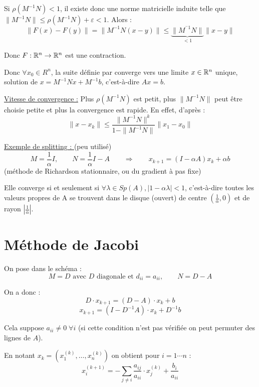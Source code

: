 Si $\rho (M^{-1}N) < 1$, il existe donc une norme matricielle induite telle que $\| M ^{-1} N \| \leq \rho (M^{-1} N) + \varepsilon < 1$. Alors :
\[
    \| F(x) - F(y) \| = \| M^{-1} N (x-y) \| \leq \underbrace{\| M^{^-1}N \|}_{< 1} \| x-y \|
\]

Donc $F : \mathbb{R}^n \rightarrow \mathbb{R}^n$ est une contraction.

Donc $\forall x_0 \in R^n$, la suite définie par  converge vers une limite $x \in \mathbb{R}^n$ unique, solution de $x = M^{-1}Nx+M^{-1}b$, c'est-à-dire $Ax=b$.

\vspace{1cm}
\underline{Vitesse de convergence :} Plus $\rho(M^{-1}N)$ est petit, plus $\|M^{-1}N\|$ peut être choisie petite et plus la convergence est rapide.
En effet, d'après  :
\[
    \|x-x_k\| \leq \frac{\|M^{-1}N\|^k}{1-\|M^{-1}N\|}\|x_1-x_0\|
\]

\vspace{1cm}
\underline{Exemple de splitting : } (peu utilisé)
\[
    M = \frac{1}{\alpha}I, \qquad N = \frac{1}{\alpha}I - A \qquad \Longrightarrow \qquad x_{k+1} = (I - \alpha A)x_k + \alpha b
\]
(méthode de Richardson stationnaire, ou du gradient à pas fixe)

Elle converge si et seulement si $\forall \lambda \in Sp(A), |1-\alpha \lambda | < 1$, c'est-à-dire toutes les valeurs propres de A se trouvent dans le disque (ouvert) de centre $(\frac{1}{\alpha}, 0)$ et de rayon $\left| \frac{1}{\alpha} \right|$.

\section{Méthode de Jacobi}
On pose dans le schéma  :
\[
    M = D \mbox{ avec $D$ diagonale et } d_{ii}=a_{ii}, \qquad N=D-A
\]

On a donc :
\begin{equation}
D \cdot x_{k+1} = (D-A) \cdot x_k + b
\end{equation}
\begin{equation}
x_{k+1} = (I - D^{-1}A) \cdot x_k + D^{-1} b
\end{equation}

\begin{remark}
    Cela suppose $a_{ii} \ne 0 \; \forall i$ (si cette condition n'est pas vérifiée on peut permuter des lignes de $A$).
\end{remark}

En notant $x_k = (x^{(k)}_1,\dots,x^{(k)}_n)$ on obtient pour $i=1 \cdots n$ :
\begin{equation}
x^{(k+1)}_i = - \sum_{j \ne i}\frac{a_{ij}}{a_{ii}} \cdot x_j^{(k)} + \frac{b_i}{a_{ii}}
\end{equation}

